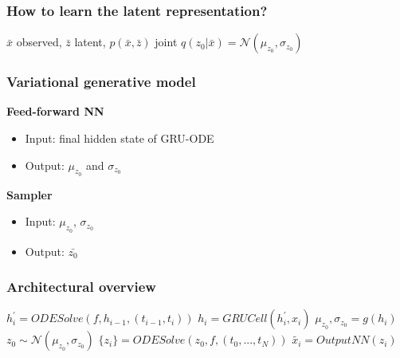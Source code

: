 \documentclass{beamer}
\begin{document}
{\begin{frame}

\end{frame}
\begin{frame}
	\frametitle{How to learn the latent representation?}
	\pause \center $\bar{x}$ observed, $\bar{z}$ latent, $p(\bar{x},\bar{z})$ joint
	\pause \center $q(z_{0}|\bar{x}) =  \mathcal{N}(\mu_{z_{0}},\sigma_{z_{0}})$
\end{frame}
}
\begin{frame}
	\frametitle{Variational generative model}
	\textbf{Feed-forward NN}
	\begin{itemize}
	 \item{Input: final hidden state of GRU-ODE}
	 \item{Output: $\mu_{z_{0}}$ and $\sigma_{z_{0}}$}
	\end{itemize}
	\hfill \break
	\pause \textbf{Sampler}
	\begin{itemize}
	 \item{Input: $\mu_{z_{0}}$, $\sigma_{z_{0}}$}
	 \item{Output: $\bar{z_{0}}$}
	\end{itemize}
\end{frame}
\begin{frame}
	\frametitle{Architectural overview}
	\center $h_{i}^{'}=ODESolve(f, h_{i-1}, (t_{i-1},t_{i}))$
	\center \pause $h_{i}=GRUCell(h_{i}^{'},x_{i})$
	\center \pause $\mu_{z_{0}}, \sigma_{z_{0}} =g(h_{i})$
	\center \pause $z_{0} \sim \mathcal{N}(\mu_{z_{0}},\sigma_{z_{0}})$
	\center \pause $\{z_{i}\}=ODESolve(z_{0}, f, (t_{0},...,t_{N}))$
	\center \pause $\widetilde{x_{i}}=OutputNN(z_{i})$

\end{frame}
\end{document}
